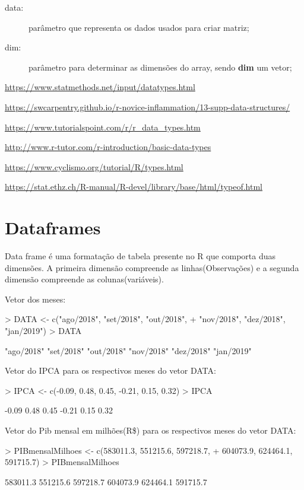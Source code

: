 \documentclass[12pt,a4paper,oneside]{erdc}
\begin{document}
       \begin{description}
       \item [data:] parâmetro que representa os dados usados para criar matriz;
       \item [dim:] parâmetro para determinar as dimensões do array, sendo \textbf{dim} um vetor;
       \end{description}

\url{https://www.statmethods.net/input/datatypes.html}

\url{https://swcarpentry.github.io/r-novice-inflammation/13-supp-data-structures/}

\url{https://www.tutorialspoint.com/r/r_data_types.htm}

\url{http://www.r-tutor.com/r-introduction/basic-data-types}

\url{https://www.cyclismo.org/tutorial/R/types.html}

\url{https://stat.ethz.ch/R-manual/R-devel/library/base/html/typeof.html}

\section{Dataframes}

Data frame é uma formatação de tabela presente no R que comporta duas dimensões. A primeira dimensão compreende as linhas(Observações) e a segunda dimensão compreende as colunas(variáveis). 

Vetor dos meses:
\begin{Schunk}
\begin{Sinput}
> DATA <- c("ago/2018", "set/2018", "out/2018", 
+           "nov/2018", "dez/2018", "jan/2019")
> DATA
\end{Sinput}
\begin{Soutput}
[1] "ago/2018" "set/2018" "out/2018" "nov/2018" "dez/2018" "jan/2019"
\end{Soutput}
\end{Schunk}

Vetor do IPCA para os respectivos meses do vetor DATA:
\begin{Schunk}
\begin{Sinput}
> IPCA <- c(-0.09, 0.48, 0.45, -0.21, 0.15, 0.32)
> IPCA
\end{Sinput}
\begin{Soutput}
[1] -0.09  0.48  0.45 -0.21  0.15  0.32
\end{Soutput}
\end{Schunk}

Vetor do Pib mensal em milhões(R\$) para os respectivos meses do vetor DATA:
\begin{Schunk}
\begin{Sinput}
> PIBmensalMilhoes <- c(583011.3, 551215.6, 597218.7,
+                       604073.9, 624464.1, 591715.7)
> PIBmensalMilhoes
\end{Sinput}
\begin{Soutput}
[1] 583011.3 551215.6 597218.7 604073.9 624464.1 591715.7
\end{Soutput}
\end{Schunk}
\end{document}
